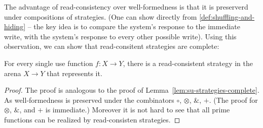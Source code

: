 The advantage of read-consistency over well-formedness is that it is preserverd under compositions of strategies. 
(One can show directly from \ref{def:shuffling-and-hiding} -- the key idea is to compare the system's response to the immediate write,
with the system's response to every other possible write). Using this observation, we can show that read-consitent strategies are complete:
\begin{lemma}
    For every single use function $f : X \to Y$, there is a read-consistent strategy in the arena $X \to Y$ that represents it. 
\end{lemma}
\begin{proof}
    The proof is analogous to the proof of Lemma~\ref{lem:su-strategies-complete}. As well-formedness is preserved
    under the combinators $\circ$, $\otimes$, $\&$, $+$. (The proof for $\otimes$, $\&$, and $+$ is immediate.)
    Moreover it is not hard to see that all prime functions can be realized by read-consisten strategies. 
\end{proof}

